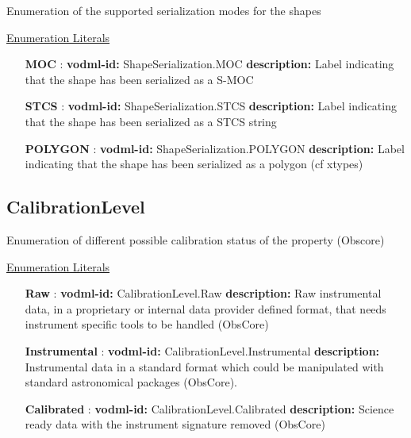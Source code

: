   Enumeration of the supported serialization modes for the shapes

  \noindent \underline{Enumeration Literals}
  \vspace{-\parsep}
  \small
  \begin{itemize}
  
    \item[\textbf{MOC}]: \textbf{vodml-id:} ShapeSerialization.MOC \newline
          \textbf{description:} Label indicating that the shape has been serialized as a S-MOC
    \item[\textbf{STCS}]: \textbf{vodml-id:} ShapeSerialization.STCS \newline
          \textbf{description:} Label indicating that the shape has been serialized as a STCS string
    \item[\textbf{POLYGON}]: \textbf{vodml-id:} ShapeSerialization.POLYGON \newline
          \textbf{description:} Label indicating that the shape has been serialized as a polygon (cf xtypes)
  \end{itemize}
  \normalsize


  \subsection{CalibrationLevel}
  \label{sect:CalibrationLevel}

  Enumeration of different possible calibration status of the property (Obscore)

  \noindent \underline{Enumeration Literals}
  \vspace{-\parsep}
  \small
  \begin{itemize}
  
    \item[\textbf{Raw}]: \textbf{vodml-id:} CalibrationLevel.Raw \newline
          \textbf{description:} Raw instrumental data, in a proprietary or internal data provider defined format, that needs instrument specific tools to be handled (ObsCore)
    \item[\textbf{Instrumental}]: \textbf{vodml-id:} CalibrationLevel.Instrumental \newline
          \textbf{description:} Instrumental data in a standard format which could be manipulated with standard astronomical packages (ObsCore).
    \item[\textbf{Calibrated}]: \textbf{vodml-id:} CalibrationLevel.Calibrated \newline
          \textbf{description:} Science ready data with the instrument signature removed (ObsCore)
  \end{itemize}
  \normalsize


